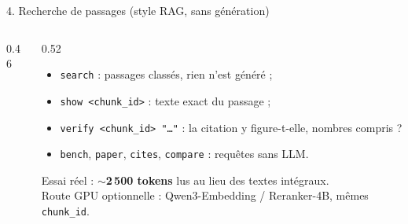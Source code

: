 \documentclass[aspectratio=169,11pt]{beamer}
\newcommand{\cmd}[1]{\texttt{\textcolor{blu}{#1}}}
\begin{document}
\begin{frame}{4. Recherche de passages (style RAG, sans génération)}
  \begin{columns}[c]
    \begin{column}{0.46\textwidth}
      \centering
    \end{column}
    \begin{column}{0.52\textwidth}
      \begin{itemize}
        \item \cmd{search} : passages classés, \alert{rien n'est généré} ;
        \item \cmd{show <chunk\_id>} : texte exact du passage ;
        \item \cmd{verify <chunk\_id> "…"} : la citation y figure-t-elle, \alert{nombres compris} ?
        \item \cmd{bench}, \cmd{paper}, \cmd{cites}, \cmd{compare} : requêtes sans LLM.
      \end{itemize}
      \medskip
      {\small Essai réel : \textbf{$\sim$2\,500 tokens} lus au lieu des textes intégraux.\\
      Route GPU optionnelle : Qwen3-Embedding / Reranker-4B, mêmes \texttt{chunk\_id}.}
    \end{column}
  \end{columns}
\end{frame}
\end{document}
